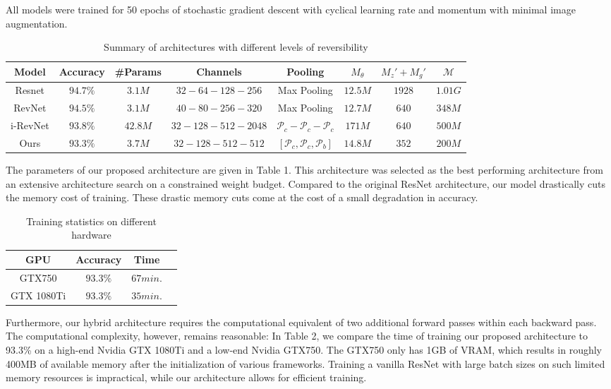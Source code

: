 \documentclass[twocolumn]{bmcart}
\begin{document}
All models were trained for 50 epochs of stochastic gradient descent with cyclical learning rate and momentum \cite{smith2017super} with minimal image augmentation.

\begin{table*}[t]
\begin{tabular}{ c c c c c c c c}
Model     & Accuracy & \#Params & Channels & Pooling  & $M_{\theta}$ & $M_{z}'+M_{g}'$ & $\mathcal{M} $ \\
\hline
Resnet    & $94.7\%$   & $3.1M$   &  $32 - 64 - 128  - 256$       & Max Pooling      				           &  $12.5M$   &  $1928$  & $1.01G$  \\
RevNet    & $94.5\%$   & $3.1M$   &  $40 - 80 - 256  - 320$       & Max Pooling      				           &  $12.7M$   &  $640$   & $348M$   \\
i-RevNet  & $93.8\%$   & $42.8M$  &  $32 - 128 - 512 - 2048$      & $\mathcal{P}_c - \mathcal{P}_c - \mathcal{P}_c$          &  $171M$    &  $640$   & $500M$   \\
Ours      & $93.3\%$   & $3.7M$   &  $32 - 128 - 512 - 512$       & $[\mathcal{P}_c, \mathcal{P}_c, \mathcal{P}_b]$          &  $14.8M$   &  $352$   & $200M$   \\
\hline
\end{tabular}
\begin{center}
\caption{Summary of architectures with different levels of reversibility}
\end{center}
\end{table*}

The parameters of our proposed architecture are given in Table 1.
This architecture was selected as the best performing architecture
from an extensive architecture search on a constrained weight budget.
Compared to the original ResNet architecture, our model drastically cuts the memory cost of training.
These drastic memory cuts come at the cost of a small degradation in accuracy.

\begin{table}[h]
\centering
\begin{tabular}{ c c c c}
 GPU & Accuracy  & Time \\
\hline
GTX750     & $93.3\%$  & $67 min.$    \\
GTX 1080Ti & $93.3\%$  & $35 min.$  \\
\hline
\end{tabular}
\caption{Training statistics on different hardware}
\end{table}

Furthermore, our hybrid architecture requires the computational equivalent of two additional forward passes within each backward pass.
The computational complexity, however, remains reasonable:
In Table 2, we compare the time of training our proposed architecture to 93.3\% on a high-end Nvidia GTX 1080Ti and a low-end
Nvidia GTX750.
The GTX750 only has 1GB of VRAM, which results in roughly 400MB of available memory after the initialization of various frameworks.
Training a vanilla ResNet with large batch sizes on such limited memory resources is impractical, while our architecture allows for efficient training.
\end{document}
